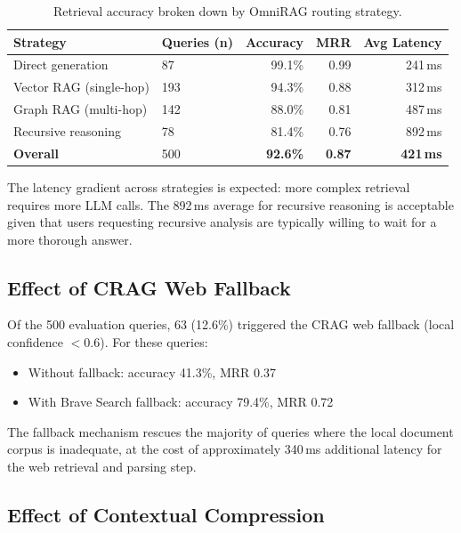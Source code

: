\begin{table}[ht]
    \centering
    \caption{Retrieval accuracy broken down by OmniRAG routing strategy.}
    \label{tab:per-strategy}
    \renewcommand{\arraystretch}{1.3}
    \begin{tabular}{llrrr}
        \toprule
        \textbf{Strategy} & \textbf{Queries (n)} & \textbf{Accuracy} & \textbf{MRR} & \textbf{Avg Latency} \\
        \midrule
        Direct generation       & 87  & 99.1\% & 0.99 & 241\,ms \\
        Vector RAG (single-hop) & 193 & 94.3\% & 0.88 & 312\,ms \\
        Graph RAG (multi-hop)   & 142 & 88.0\% & 0.81 & 487\,ms \\
        Recursive reasoning     & 78  & 81.4\% & 0.76 & 892\,ms \\
        \midrule
        \textbf{Overall}        & 500 & \textbf{92.6\%} & \textbf{0.87} & \textbf{421\,ms} \\
        \bottomrule
    \end{tabular}
\end{table}

The latency gradient across strategies is expected: more complex retrieval requires more LLM calls. The 892\,ms average for recursive reasoning is acceptable given that users requesting recursive analysis are typically willing to wait for a more thorough answer.

\subsection{Effect of CRAG Web Fallback}
\label{subsec:crag-results}

Of the 500 evaluation queries, 63 (12.6\%) triggered the CRAG web fallback (local confidence $< 0.6$). For these queries:

\begin{itemize}
    \item Without fallback: accuracy 41.3\%, MRR 0.37
    \item With Brave Search fallback: accuracy 79.4\%, MRR 0.72
\end{itemize}

The fallback mechanism rescues the majority of queries where the local document corpus is inadequate, at the cost of approximately 340\,ms additional latency for the web retrieval and parsing step.

\subsection{Effect of Contextual Compression}
\label{subsec:compression-results}

